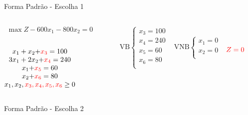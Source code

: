 \documentclass{beamer}
\begin{document}
\begin{frame}
	{
		\begin{block}{Forma Padrão - {\color{cyan}Escolha 1}}
			\begin{columns}
				\begin{column}{0.35\textwidth}
					$
						\begin{matrix}
							\max Z - 600x_1 - 800x_2 = 0 \\
						\end{matrix}
					$ \\
					 \\
					$
						\begin{matrix}
							x_1+x_2  {+\color{red}x_3} = 100 \\
							3x_1+2x_2 {+ \color{red}x_4} = 240 \\
							x_1  {+ \color{red}x_5} = 60 \\
							x_2 {+ \color{red}x_6} = 80 \\
							x_1,x_2, {\color{red} x_3, x_4, x_5, x_6} \ge 0 \\
						\end{matrix}
					$
				\end{column}
				\vline
				\hspace{0.1cm}
				\begin{column}{0.45\textwidth}
					$
						\begin{matrix}
							\text{VB} \left\{  \begin{matrix}
														 x_3 = 100 \\
														 x_4 = 240 \\
														 x_5 = 60 \\
														 x_6 = 80 \\
								   \end{matrix} 
						   \right.
							&
							\text{VNB} \left\{  \begin{matrix}
														 x_1 = 0 \\
														 x_2 = 0 \\
								   \end{matrix} 
						   \right. 
							\\
							 & \\
						\end{matrix}
					$
					$ {\color{red}Z = 0} $
				\end{column}
			\end{columns}
		\end{block}
	}
	{
		\begin{block}{Forma Padrão - {\color{cyan}Escolha 2}}

\end{block}}
\end{frame}
\end{document}
